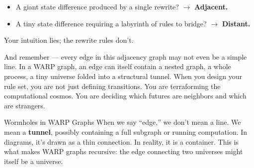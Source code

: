 \begin{itemize}
    \item A giant state difference produced by a single rewrite? $\rightarrow$ \textbf{Adjacent.}
    \item A tiny state difference requiring a labyrinth of rules to bridge? $\rightarrow$ \textbf{Distant.}
\end{itemize}

Your intuition lies; the rewrite rules don't.

And remember --- every edge in this adjacency graph may not even be a simple line. In a WARP graph, an edge can itself contain a nested graph, a whole process, a tiny universe folded into a structural tunnel. When you design your rule set, you are not just defining transitions. You are terraforming the computational cosmos. You are deciding which futures are neighbors and which are strangers.

\begin{callout}{Wormholes in WARP Graphs}
When we say ``edge,'' we don't mean a line. We mean a \textbf{tunnel}, possibly containing a full subgraph or running computation. In diagrams, it's drawn as a thin connection. In reality, it is a container. This is what makes WARP graphs recursive: the edge connecting two universes might itself be a universe.
\end{callout}

\begin{center}
\end{center}

